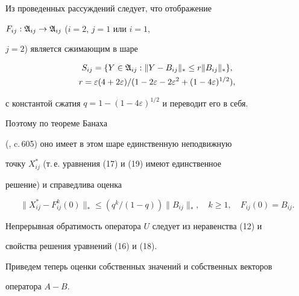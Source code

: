 \begin{pf}


Из проведенных рассуждений следует, что отображение


$F_{ij}:\frak A_{ij}\to\frak A_{ij}$ ($i=2$, $j=1$ или $i=1$,


$j=2$) является сжимающим в шаре


\begin{gather*}


S_{ij}=\{Y\in\frak A_{ij}:\|Y-B_{ij}\|_* \le r\|B_{ij}\|_*\}, \\


r=\varepsilon(4+2\varepsilon)/(1-2\varepsilon-2\varepsilon^2+


(1-4\varepsilon)^{1/2}),


\end{gather*}


с константой сжатия $q=1-(1-4\varepsilon)^{1/2}$ и переводит его в себя.


Поэтому по теореме Банаха


(\cite{Kant}, c.\,605) оно имеет в этом шаре единственную неподвижную


точку $X^*_{ij}$ (т.\,е. уравнения (17) и (19) имеют единственное


решение) и справедлива оценка


\begin{equation}


\|X^*_{ij}-F^k_{ij}(0)\|_* \le


(q^k/(1-q))\|B_{ij}\|_*,\quad k\ge 1,\quad


F_{ij}(0)=B_{ij}.


\end{equation}





Непрерывная обратимость оператора $U$ следует из неравенства (12) и


свойства решения уравнений (16) и (18).


\end{pf}





Приведем теперь оценки собственных значений и собственных векторов


оператора $A-B$.





